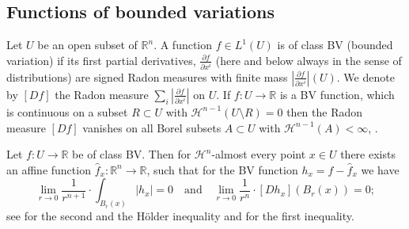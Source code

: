 \documentclass[12pt,leqno,intlimits]{amsart}
\numberwithin{equation}{section}
\theoremstyle{definition}
\theoremstyle{remark}
\newtheorem{rem}[thm]{Remark}
\newcommand{\R}{\mathbb{R}}
\def\co{\colon\thinspace}
\def\:{\colon}
\begin{document}

\subsection{Functions of bounded variations}
Let $U$ be an open subset of $\R^n$. A function $f\in L^1 (U)$ is of class BV (bounded variation) if its first partial derivatives,
$\frac{\partial f}{\partial x^i}$ (here and below always in the sense of distributions) are signed Radon measures with finite mass
$|\frac{\partial f}{\partial x^i}|(U)$. We denote by $[Df ]$ the Radon measure $\sum_i |\frac{\partial f}{\partial x^i}|$ on $U$. 
If $f\:U\to \R$ is a BV function, which is continuous on a subset $R \subset U$ with $\mathcal H^{n-1} (U\setminus R)=0$ then the Radon measure $[Df]$ vanishes on all Borel subsets $A\subset U$ with $\mathcal H^{n-1} (A)<\infty$, \cite{Goffmann}.

Let $f\:U\to \R$ be of class BV. Then for $\mathcal H^n$-almost every point
$x\in U$ there exists an affine function $\hat f _x\:\R^n\to \R$, such that for the BV function $h_x=f-\hat f_x$ we have
\begin{equation}\label{DC-ae-diff}
\lim_{r\to 0}\frac 1 {r^{n+1}}\cdot \int _{B_r(x)}|h_x| =0
\quad\text{and}\quad
\lim _{r\to 0} \frac 1 {r^n} \cdot [Dh_x] (B_r (x)) =0;
\end{equation}
see \cite[ Theorem 6.1 (2),(3)]{Evans} for the second and the H\"older inequality and \cite[ Theorem 6.1 (1)]{Evans} for the first inequality.

\end{document}
